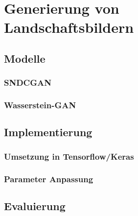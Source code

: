 \chapter{Generierung von Landschaftsbildern}\label{chp:bildgenerierung} %
 \glsresetall
 
 \section{Modelle}%
 
 \subsection{SNDCGAN} %
 
 \subsection{Wasserstein-GAN} %
 
 \section{Implementierung} %
 
 \subsection{Umsetzung in Tensorflow/Keras}
 
 \subsection{Parameter Anpassung} %
 
 \section{Evaluierung} %